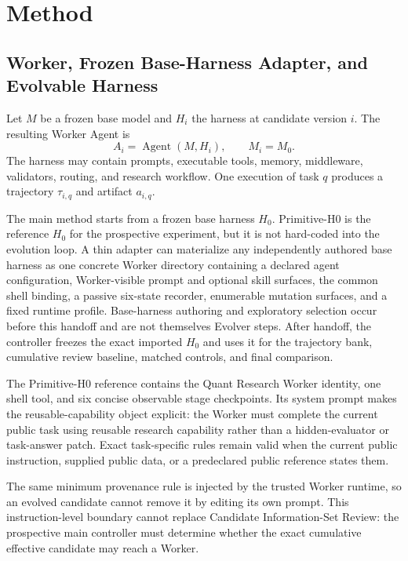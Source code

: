 \section{Method}

\subsection{Worker, Frozen Base-Harness Adapter, and Evolvable Harness}

Let $M$ be a frozen base model and $H_i$ the harness at candidate version $i$.
The resulting Worker Agent is
\begin{equation}
    A_i = \operatorname{Agent}(M,H_i), \qquad M_i=M_0.
\end{equation}
The harness may contain prompts, executable tools, memory, middleware,
validators, routing, and research workflow. One execution of task $q$ produces
a trajectory $\tau_{i,q}$ and artifact $a_{i,q}$.

The main method starts from a frozen base harness $H_0$. Primitive-H0 is the
reference $H_0$ for the prospective experiment, but it is not hard-coded into
the evolution loop. A thin adapter can materialize any independently authored
base harness as one concrete Worker directory containing a declared agent
configuration, Worker-visible prompt and optional skill surfaces, the common
shell binding, a passive six-state recorder, enumerable mutation surfaces, and
a fixed runtime profile. Base-harness authoring and exploratory selection occur
before this handoff and are not themselves Evolver steps. After handoff, the
controller freezes the exact imported $H_0$ and uses it for the trajectory bank,
cumulative review baseline, matched controls, and final comparison.

The Primitive-H0 reference contains the Quant Research Worker identity, one
shell tool, and six concise observable stage checkpoints. Its system prompt
makes the reusable-capability object explicit:
the Worker must complete the current public task using reusable research
capability rather than a hidden-evaluator or task-answer patch. Exact
task-specific rules remain valid when the current public instruction, supplied
public data, or a predeclared public reference states them.

The same minimum provenance rule is injected by the trusted Worker runtime, so
an evolved candidate cannot remove it by editing its own prompt. This
instruction-level boundary cannot replace Candidate Information-Set Review:
the prospective main controller must determine whether the exact cumulative
effective candidate may reach a Worker.

